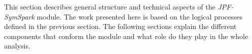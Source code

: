 \label{sec:module}


This section describes general structure and technical aspects of the \textit{JPF-SymSpark} module. The work presented here is based on the logical processes defined in the previous section. The following sections explain the different components that conform the module and what role do they play in the whole analysis.






